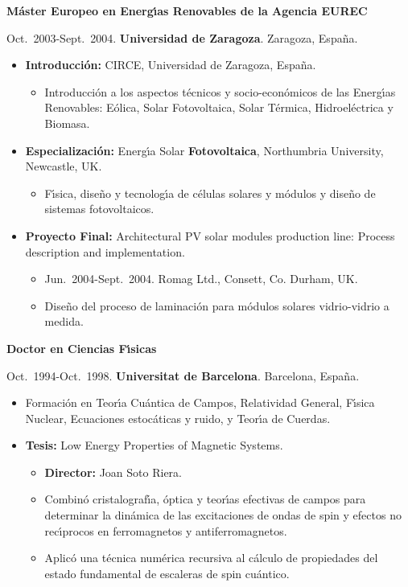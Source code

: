 \documentclass{article}
\begin{document}
\medskip
{\bf M\'aster Europeo en Energ\'{\i}as Renovables de la Agencia EUREC}

\medskip
Oct.~2003-Sept.~2004. {\bf Universidad de Zaragoza}. Zaragoza, Espa\~na.

\begin{itemize}\itemsep 0pt
\item {\bf Introducci\'on:} CIRCE, Universidad de Zaragoza, Espa\~na.
\begin{itemize} 
\item Introducci\'on a los aspectos t\'ecnicos y socio-econ\'omicos de las Energ\'{\i}as Renovables: E\'olica, Solar Fotovoltaica, Solar T\'ermica, Hidroel\'ectrica y Biomasa.
\end{itemize}
\item {\bf Especializaci\'on:} Energ\'{\i}a Solar {\bf Fotovoltaica}, Northumbria University, Newcastle, UK.
\begin{itemize}
\item F\'{\i}sica, dise\~no y tecnolog\'{\i}a de c\'elulas solares y m\'odulos y dise\~no de sistemas fotovoltaicos.
\end{itemize}
\item {\bf Proyecto Final:} Architectural PV solar modules production line: Process description and implementation.
\begin{itemize}
\item Jun.~2004-Sept.~2004. Romag Ltd., Consett, Co. Durham, UK.
\item Dise\~no del proceso de laminaci\'on para m\'odulos solares vidrio-vidrio a medida.
\end{itemize}
\end{itemize}

\newpage
\medskip
{\bf Doctor en Ciencias F\'{\i}sicas}

\medskip
Oct.~1994-Oct.~1998. {\bf Universitat de Barcelona}. Barcelona, Espa\~na.

\begin{itemize}\itemsep 0pt
\item Formaci\'on en Teor\'{\i}a Cu\'{a}ntica de Campos, Relatividad General, F\'{\i}sica Nuclear, Ecuaciones estoc\'{a}ticas y ruido, y Teor\'{\i}a de Cuerdas.
\item {\bf Tesis:} Low Energy Properties of Magnetic Systems.
\begin{itemize}
\item {\bf Director:} Joan Soto Riera. 
\item Combin\'{o} cristalograf\'{\i}a, \'{o}ptica y teor\'{\i}as efectivas 
de campos para determinar la din\'{a}mica de las excitaciones de ondas de 
spin y efectos no rec\'{\i}procos en ferromagnetos y antiferromagnetos.
\item Aplic\'{o} una t\'{e}cnica num\'{e}rica recursiva al c\'{a}lculo 
de propiedades del estado fundamental de escaleras de spin cu\'{a}ntico.
\end{itemize}
\end{itemize}
\end{document}

